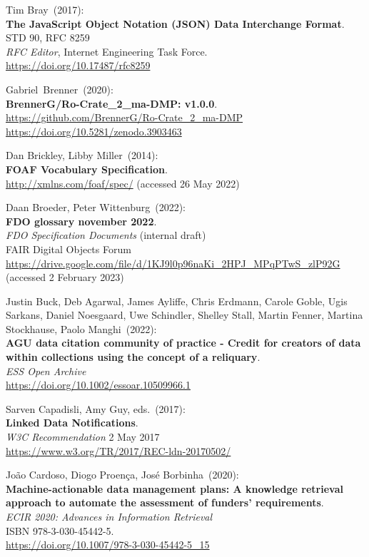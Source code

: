 \begin{thebibliography}{9}
Tim Bray~(2017): \\
\textbf{The JavaScript Object Notation (JSON) Data Interchange Format}.\\
STD 90, RFC 8259\\
\emph{RFC Editor}, 
Internet Engineering Task Force.\\
\url{https://doi.org/10.17487/rfc8259}

Gabriel~Brenner~(2020): \\
\textbf{BrennerG/Ro-Crate\_2\_ma-DMP: v1.0.0}.\\
\url{https://github.com/BrennerG/Ro-Crate_2_ma-DMP}\\
\url{https://doi.org/10.5281/zenodo.3903463}

Dan Brickley, Libby Miller~(2014): \\
\textbf{FOAF Vocabulary Specification}.\\
\url{http://xmlns.com/foaf/spec/} (accessed 26 May 2022)

Daan Broeder, Peter Wittenburg~(2022): \\
\textbf{{FDO} glossary november 2022}.\\
\emph{FDO Specification Documents} (internal draft)\\
FAIR Digital Objects Forum\\
\url{https://drive.google.com/file/d/1KJ9l0p96naKi_2HPJ_MPqPTwS_zlP92G}
(accessed 2 February 2023)

Justin Buck, Deb Agarwal, James Ayliffe, Chris Erdmann, Carole Goble, Ugis Sarkans, Daniel Noesgaard, Uwe Schindler, Shelley Stall, Martin Fenner, Martina Stockhause, Paolo Manghi~(2022): \\
\textbf{AGU data citation community of practice - Credit for creators of data within collections using the concept of a reliquary}.\\ 
\emph{ESS Open Archive}\\
\url{https://doi.org/10.1002/essoar.10509966.1}


Sarven Capadisli, Amy Guy, eds.~(2017): \\
\textbf{Linked Data Notifications}.\\
\emph{W3C Recommendation} 2 May 2017 \\
\url{https://www.w3.org/TR/2017/REC-ldn-20170502/}

João Cardoso, Diogo Proença, José Borbinha~(2020): \\
\textbf{Machine-actionable data management plans: A knowledge retrieval approach to automate the assessment of funders' requirements}.\\
\emph{ECIR 2020: Advances in Information Retrieval}\\
ISBN 978-3-030-45442-5.\\
\url{https://doi.org/10.1007/978-3-030-45442-5_15}


\end{thebibliography}

